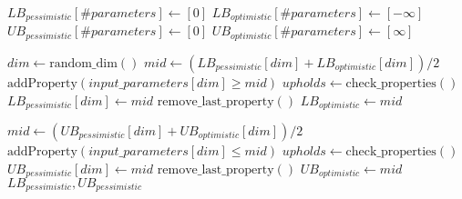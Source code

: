 \begin{algorithmic}[1]
    \State $LB_{pessimistic}[\#parameters] \gets [0]$
    \State $LB_{optimistic}[\#parameters] \gets [- \infty]$
    \State $UB_{pessimistic}[\#parameters] \gets [ 0]$
    \State $UB_{optimistic}[\#parameters] \gets [ \infty]$
    \item[]
        \State $dim \gets \text{random\_dim}()$
        \State $mid \gets (LB_{pessimistic}[dim] + LB_{optimistic}[dim]) / 2$ 
        \State $\text{addProperty}(input\_parameters[dim] \geq mid)$
        \State $upholds \gets \text{check\_properties}()$
            \State $LB_{pessimistic}[dim] \gets mid$
        \Else
            \State $\text{remove\_last\_property}()$
            \State $LB_{optimistic} \gets mid$
        \EndIf
        \item[]
        \State $mid \gets (UB_{pessimistic}[dim] + UB_{optimistic}[dim]) / 2$ 
        \State $\text{addProperty}(input\_parameters[dim] \leq mid)$
        \State $upholds \gets \text{check\_properties}()$
            \State $UB_{pessimistic}[dim] \gets mid$
        \Else
            \State $\text{remove\_last\_property}()$
            \State $UB_{optimistic} \gets mid$
        \EndIf
    \EndWhile
    \State \Return $LB_{pessimistic}, UB_{pessimistic}$
\end{algorithmic}